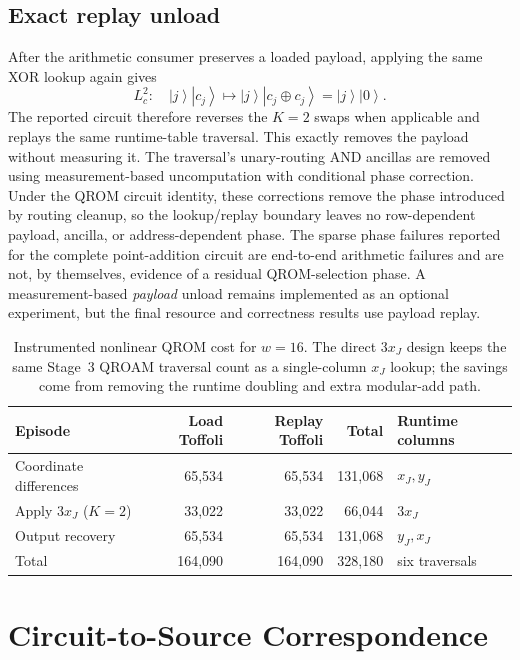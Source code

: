 \documentclass[10pt]{article}
\newcommand{\ket}[1]{\left\lvert #1\right\rangle}
\begin{document}
\subsection{Exact replay unload}

After the arithmetic consumer preserves a loaded payload, applying the same XOR lookup again gives
\begin{equation}
L_c^2:\quad \ket{j}\ket{c_j}\longmapsto\ket{j}\ket{c_j\oplus c_j}=\ket{j}\ket{0}.
\label{eq:replay-unload}
\end{equation}
The reported circuit therefore reverses the $K=2$ swaps when applicable and replays the same runtime-table traversal. This exactly removes the payload without measuring it. The traversal's unary-routing AND ancillas are removed using measurement-based uncomputation with conditional phase correction. Under the QROM circuit identity, these corrections remove the phase introduced by routing cleanup, so the lookup/replay boundary leaves no row-dependent payload, ancilla, or address-dependent phase. The sparse phase failures reported for the complete point-addition circuit are end-to-end arithmetic failures and are not, by themselves, evidence of a residual QROM-selection phase. A measurement-based \emph{payload} unload remains implemented as an optional experiment, but the final resource and correctness results use payload replay.

\begin{table}[ht]
\centering
\small
\begin{tabular}{@{}lrrrl@{}}
\toprule
Episode & Load Toffoli & Replay Toffoli & Total & Runtime columns \\
\midrule
Coordinate differences & 65,534 & 65,534 & 131,068 & $x_J,y_J$ \\
Apply $3x_J$ ($K=2$) & 33,022 & 33,022 & 66,044 & $3x_J$ \\
Output recovery & 65,534 & 65,534 & 131,068 & $y_J,x_J$ \\
\midrule
Total & 164,090 & 164,090 & 328,180 & six traversals \\
\bottomrule
\end{tabular}
\caption{Instrumented nonlinear QROM cost for $w=16$. The direct $3x_J$ design keeps the same Stage~3 QROAM traversal count as a single-column $x_J$ lookup; the savings come from removing the runtime doubling and extra modular-add path.}
\label{tab:qrom-cost}
\end{table}

\section{Circuit-to-Source Correspondence}
\end{document}
